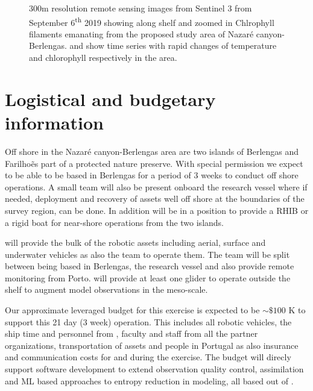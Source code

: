 \begin{figure}[!h]
  \caption{300m resolution remote sensing images from Sentinel 3 from
    September 6\textsuperscript{th} 2019 showing along shelf
     and zoomed in Chlrophyll filaments
     emanating from the proposed study area of
    Nazar\'e canyon-Berlengas.  and
     show time series with rapid changes of
    temperature and chlorophyll respectively in the area.}
  \label{fig:studyarea-2}
\end{figure}

\section*{Logistical and budgetary information}

Off shore in the Nazar\'e canyon-Berlengas area are two islands of
Berlengas and Farilho\~es part of a protected nature preserve. With
special permission we expect to be able to be based in Berlengas for a
period of 3 weeks to conduct off shore operations. A small team will
also be present onboard the \inst research vessel where if needed,
deployment and recovery of assets well off shore at the boundaries of
the survey region, can be done. In addition \inst will be in a
position to provide a RHIB or a rigid boat for near-shore operations
from the two islands.

\univ will provide the bulk of the robotic assets including
aerial, surface and underwater vehicles as also the team to operate
them. The team will be split between being based in Berlengas, the
research vessel and also provide remote monitoring from Porto. \soc
will provide at least one glider to operate outside the shelf to
augment model observations in the meso-scale.

Our approximate leveraged budget for this exercise is expected to be
$\sim \$100$ K to support this 21 day (3 week) operation. This
includes all robotic vehicles, the ship time and personnel from
\inste, faculty and staff from all the partner organizations,
transportation of assets and people in Portugal as also insurance and
communication costs for and during the exercise. The budget will
direcly support software development to extend observation quality
control, assimilation and ML based approaches to entropy reduction in
modeling, all based out of \unive.

